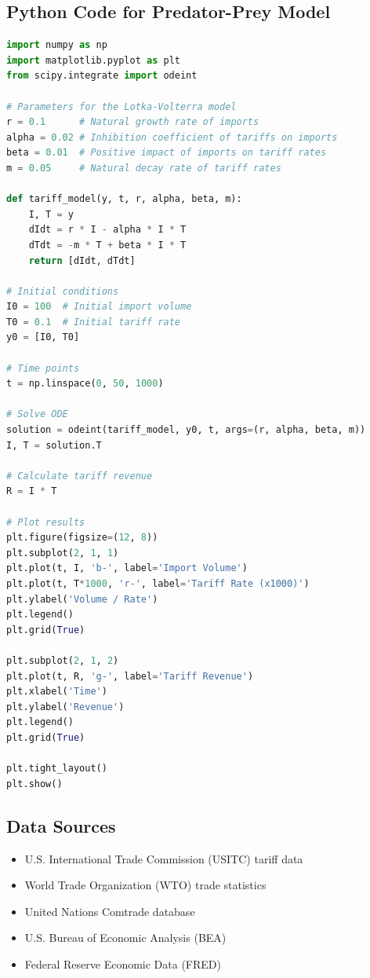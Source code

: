 \documentclass[12pt]{article}
\begin{document}
\subsection{Python Code for Predator-Prey Model}
\begin{lstlisting}[language=Python,caption={Python code for predator-prey model}]
import numpy as np
import matplotlib.pyplot as plt
from scipy.integrate import odeint

# Parameters for the Lotka-Volterra model
r = 0.1      # Natural growth rate of imports
alpha = 0.02 # Inhibition coefficient of tariffs on imports
beta = 0.01  # Positive impact of imports on tariff rates
m = 0.05     # Natural decay rate of tariff rates

def tariff_model(y, t, r, alpha, beta, m):
    I, T = y
    dIdt = r * I - alpha * I * T
    dTdt = -m * T + beta * I * T
    return [dIdt, dTdt]

# Initial conditions
I0 = 100  # Initial import volume
T0 = 0.1  # Initial tariff rate
y0 = [I0, T0]

# Time points
t = np.linspace(0, 50, 1000)

# Solve ODE
solution = odeint(tariff_model, y0, t, args=(r, alpha, beta, m))
I, T = solution.T

# Calculate tariff revenue
R = I * T

# Plot results
plt.figure(figsize=(12, 8))
plt.subplot(2, 1, 1)
plt.plot(t, I, 'b-', label='Import Volume')
plt.plot(t, T*1000, 'r-', label='Tariff Rate (x1000)')
plt.ylabel('Volume / Rate')
plt.legend()
plt.grid(True)

plt.subplot(2, 1, 2)
plt.plot(t, R, 'g-', label='Tariff Revenue')
plt.xlabel('Time')
plt.ylabel('Revenue')
plt.legend()
plt.grid(True)

plt.tight_layout()
plt.show()
\end{lstlisting}

\subsection{Data Sources}
\begin{itemize}
    \item U.S. International Trade Commission (USITC) tariff data
    \item World Trade Organization (WTO) trade statistics
    \item United Nations Comtrade database
    \item U.S. Bureau of Economic Analysis (BEA)
    \item Federal Reserve Economic Data (FRED)
\end{itemize}
\end{document}

